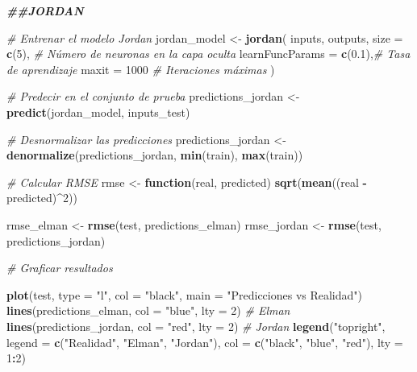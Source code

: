 \documentclass[
]{book}
\newenvironment{Shaded}{\begin{snugshade}}{\end{snugshade}}
\newcommand{\AttributeTok}[1]{\textcolor[rgb]{0.13,0.29,0.53}{#1}}
\newcommand{\CommentTok}[1]{\textcolor[rgb]{0.56,0.35,0.01}{\textit{#1}}}
\newcommand{\ControlFlowTok}[1]{\textcolor[rgb]{0.13,0.29,0.53}{\textbf{#1}}}
\newcommand{\DecValTok}[1]{\textcolor[rgb]{0.00,0.00,0.81}{#1}}
\newcommand{\DocumentationTok}[1]{\textcolor[rgb]{0.56,0.35,0.01}{\textbf{\textit{#1}}}}
\newcommand{\FloatTok}[1]{\textcolor[rgb]{0.00,0.00,0.81}{#1}}
\newcommand{\FunctionTok}[1]{\textcolor[rgb]{0.13,0.29,0.53}{\textbf{#1}}}
\newcommand{\NormalTok}[1]{#1}
\newcommand{\OtherTok}[1]{\textcolor[rgb]{0.56,0.35,0.01}{#1}}
\newcommand{\SpecialCharTok}[1]{\textcolor[rgb]{0.81,0.36,0.00}{\textbf{#1}}}
\newcommand{\StringTok}[1]{\textcolor[rgb]{0.31,0.60,0.02}{#1}}
\begin{document}
\begin{Shaded}
\begin{Highlighting}[]
\DocumentationTok{\#\#JORDAN}

\CommentTok{\# Entrenar el modelo Jordan}
\NormalTok{jordan\_model }\OtherTok{\textless{}{-}} \FunctionTok{jordan}\NormalTok{(}
\NormalTok{  inputs,}
\NormalTok{  outputs,}
  \AttributeTok{size =} \FunctionTok{c}\NormalTok{(}\DecValTok{5}\NormalTok{),             }\CommentTok{\# Número de neuronas en la capa oculta}
  \AttributeTok{learnFuncParams =} \FunctionTok{c}\NormalTok{(}\FloatTok{0.1}\NormalTok{),}\CommentTok{\# Tasa de aprendizaje}
  \AttributeTok{maxit =} \DecValTok{1000}             \CommentTok{\# Iteraciones máximas}
\NormalTok{)}

\CommentTok{\# Predecir en el conjunto de prueba}
\NormalTok{predictions\_jordan }\OtherTok{\textless{}{-}} \FunctionTok{predict}\NormalTok{(jordan\_model, inputs\_test)}

\CommentTok{\# Desnormalizar las predicciones}
\NormalTok{predictions\_jordan }\OtherTok{\textless{}{-}} \FunctionTok{denormalize}\NormalTok{(predictions\_jordan, }\FunctionTok{min}\NormalTok{(train), }\FunctionTok{max}\NormalTok{(train))}

\CommentTok{\# Calcular RMSE}
\NormalTok{rmse }\OtherTok{\textless{}{-}} \ControlFlowTok{function}\NormalTok{(real, predicted) }\FunctionTok{sqrt}\NormalTok{(}\FunctionTok{mean}\NormalTok{((real }\SpecialCharTok{{-}}\NormalTok{ predicted)}\SpecialCharTok{\^{}}\DecValTok{2}\NormalTok{))}

\NormalTok{rmse\_elman }\OtherTok{\textless{}{-}} \FunctionTok{rmse}\NormalTok{(test, predictions\_elman)}
\NormalTok{rmse\_jordan }\OtherTok{\textless{}{-}} \FunctionTok{rmse}\NormalTok{(test, predictions\_jordan)}

\CommentTok{\# Graficar resultados}


\FunctionTok{plot}\NormalTok{(test, }\AttributeTok{type =} \StringTok{"l"}\NormalTok{, }\AttributeTok{col =} \StringTok{"black"}\NormalTok{, }\AttributeTok{main =} \StringTok{"Predicciones vs Realidad"}\NormalTok{)}
\FunctionTok{lines}\NormalTok{(predictions\_elman, }\AttributeTok{col =} \StringTok{"blue"}\NormalTok{, }\AttributeTok{lty =} \DecValTok{2}\NormalTok{)  }\CommentTok{\# Elman}
\FunctionTok{lines}\NormalTok{(predictions\_jordan, }\AttributeTok{col =} \StringTok{"red"}\NormalTok{, }\AttributeTok{lty =} \DecValTok{2}\NormalTok{)  }\CommentTok{\# Jordan}
\FunctionTok{legend}\NormalTok{(}\StringTok{"topright"}\NormalTok{, }\AttributeTok{legend =} \FunctionTok{c}\NormalTok{(}\StringTok{"Realidad"}\NormalTok{, }\StringTok{"Elman"}\NormalTok{, }\StringTok{"Jordan"}\NormalTok{),}
       \AttributeTok{col =} \FunctionTok{c}\NormalTok{(}\StringTok{"black"}\NormalTok{, }\StringTok{"blue"}\NormalTok{, }\StringTok{"red"}\NormalTok{), }\AttributeTok{lty =} \DecValTok{1}\SpecialCharTok{:}\DecValTok{2}\NormalTok{)}
\end{Highlighting}
\end{Shaded}
\end{document}
